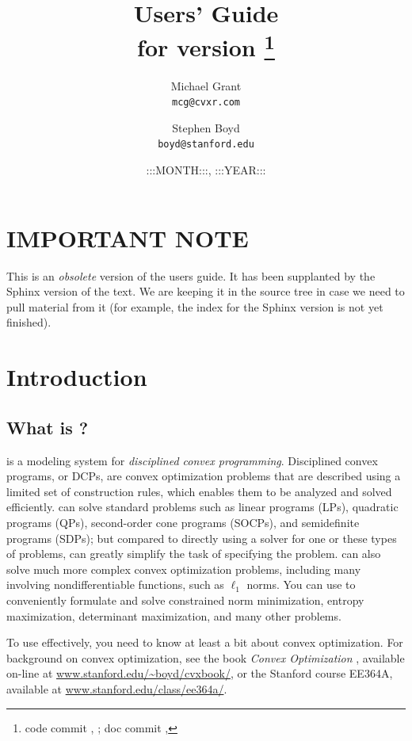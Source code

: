 \documentclass[12pt]{article}
\title{\cvx Users' Guide\\\large for \cvx version \cvxver\footnote{code commit \cvxbuild, \cvxbdate; doc commit \cvxdbuild, \cvxddate}}
\author{Michael Grant\\\texttt{mcg@cvxr.com} 
\and Stephen Boyd\\\texttt{boyd@stanford.edu}}
\date{:::MONTH:::, :::YEAR:::}
\begin{document}
\maketitle
\clearpage
\tableofcontents
\clearpage

\section{IMPORTANT NOTE}

This is an \emph{obsolete} version of the users guide. It has been supplanted by the
Sphinx version of the text. We are keeping it in the source tree in case we need 
to pull material from it (for example, the index for the Sphinx version is not 
yet finished). 

\section{Introduction}

\subsection{What is \cvx?}

\cvx is a modeling system for \emph{disciplined convex programming}. 
Disciplined convex programs, or DCPs, are convex optimization problems 
that are described using a limited set of construction rules, which
enables them to be analyzed and solved efficiently.  \cvx can solve 
standard problems such as linear programs (LPs), quadratic programs (QPs),
second-order cone programs (SOCPs), and semidefinite programs (SDPs);
but compared to directly using a solver for one or these types of problems,
\cvx can greatly simplify the task of specifying the problem.
\cvx can also solve much more complex convex optimization problems,
including many involving nondifferentiable functions, such as $\ell_1$
norms.
You can use \cvx to conveniently formulate and solve
constrained norm minimization, entropy maximization,
determinant maximization, and many other problems.

To use \cvx effectively, you need to know at least a bit about 
convex optimization.
For background on convex optimization,
see the book \emph{Convex Optimization} \cite{BV:04}, available on-line
at \url{www.stanford.edu/~boyd/cvxbook/}, or the 
Stanford course EE364A, available at
\url{www.stanford.edu/class/ee364a/}.
\end{document}
